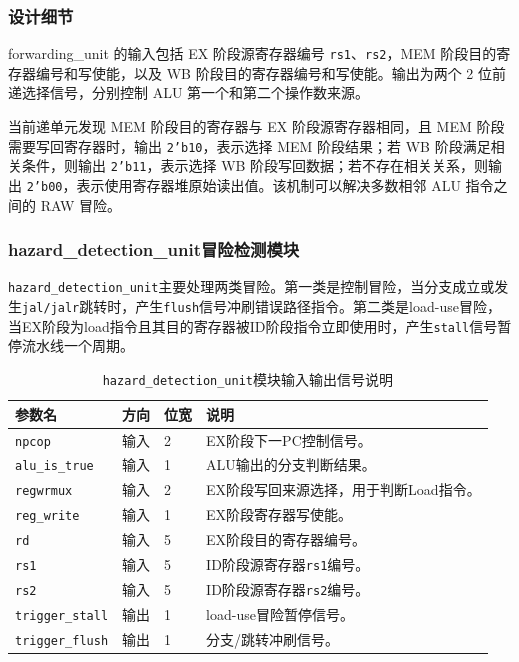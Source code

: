 \documentclass[12pt,a4paper]{ctexart}
\newcommand{\code}[1]{\texttt{#1}}
\begin{document}
\subsubsection*{设计细节}

forwarding\_unit 的输入包括 EX 阶段源寄存器编号 \code{rs1}、\code{rs2}，MEM 阶段目的寄存器编号和写使能，以及 WB 阶段目的寄存器编号和写使能。输出为两个 2 位前递选择信号，分别控制 ALU 第一个和第二个操作数来源。

当前递单元发现 MEM 阶段目的寄存器与 EX 阶段源寄存器相同，且 MEM 阶段需要写回寄存器时，输出 \code{2'b10}，表示选择 MEM 阶段结果；若 WB 阶段满足相关条件，则输出 \code{2'b11}，表示选择 WB 阶段写回数据；若不存在相关关系，则输出 \code{2'b00}，表示使用寄存器堆原始读出值。该机制可以解决多数相邻 ALU 指令之间的 RAW 冒险。

\subsubsection{hazard\_detection\_unit冒险检测模块}

\code{hazard\_detection\_unit}主要处理两类冒险。第一类是控制冒险，当分支成立或发生\code{jal/jalr}跳转时，产生\code{flush}信号冲刷错误路径指令。第二类是load-use冒险，当EX阶段为load指令且其目的寄存器被ID阶段指令立即使用时，产生\code{stall}信号暂停流水线一个周期。

\begin{table}[H]
	\centering
	\caption{\code{hazard\_detection\_unit}模块输入输出信号说明}
	\footnotesize
	\renewcommand{\arraystretch}{1.15}
	\begin{tabularx}{\textwidth}{p{3.2cm}p{1.5cm}p{2.1cm}X}
		\toprule
		参数名                   & 方向 & 位宽 & 说明                     \\
		\midrule
		\code{npcop}          & 输入 & 2  & EX阶段下一PC控制信号。          \\
		\code{alu\_is\_true}  & 输入 & 1  & ALU输出的分支判断结果。          \\
		\code{regwrmux}       & 输入 & 2  & EX阶段写回来源选择，用于判断Load指令。 \\
		\code{reg\_write}     & 输入 & 1  & EX阶段寄存器写使能。            \\
		\code{rd}             & 输入 & 5  & EX阶段目的寄存器编号。           \\
		\code{rs1}            & 输入 & 5  & ID阶段源寄存器\code{rs1}编号。  \\
		\code{rs2}            & 输入 & 5  & ID阶段源寄存器\code{rs2}编号。  \\
		\code{trigger\_stall} & 输出 & 1  & load-use冒险暂停信号。        \\
		\code{trigger\_flush} & 输出 & 1  & 分支/跳转冲刷信号。             \\
		\bottomrule
	\end{tabularx}
\end{table}
\end{document}
